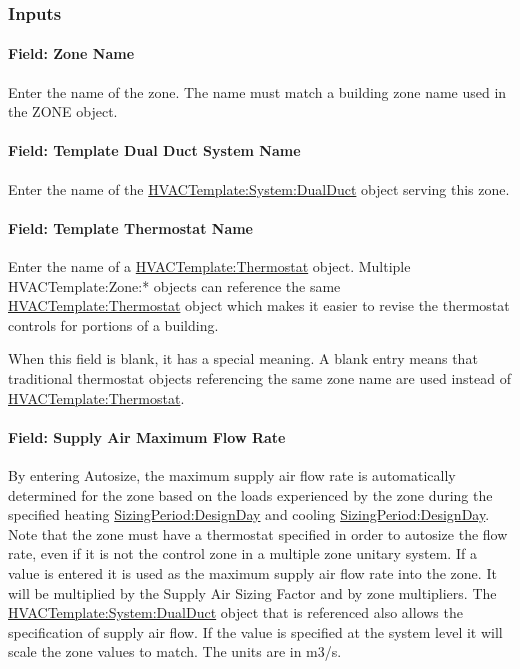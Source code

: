 \subsubsection{Inputs}\label{inputs-13-005}

\paragraph{Field: Zone Name}\label{field-zone-name-12}

Enter the name of the zone. The name must match a building zone name used in the ZONE object.

\paragraph{Field: Template Dual Duct System Name}\label{field-template-dual-duct-system-name}

Enter the name of the \hyperref[hvactemplatesystemdualduct]{HVACTemplate:System:DualDuct} object serving this zone.

\paragraph{Field: Template Thermostat Name}\label{field-template-thermostat-name-12}

Enter the name of a \hyperref[hvactemplatethermostat]{HVACTemplate:Thermostat} object. Multiple HVACTemplate:Zone:* objects can reference the same \hyperref[hvactemplatethermostat]{HVACTemplate:Thermostat} object which makes it easier to revise the thermostat controls for portions of a building.

When this field is blank, it has a special meaning. A blank entry means that traditional thermostat objects referencing the same zone name are used instead of \hyperref[hvactemplatethermostat]{HVACTemplate:Thermostat}.

\paragraph{Field: Supply Air Maximum Flow Rate}\label{field-supply-air-maximum-flow-rate-5}

By entering Autosize, the maximum supply air flow rate is automatically determined for the zone based on the loads experienced by the zone during the specified heating \hyperref[sizingperioddesignday]{SizingPeriod:DesignDay} and cooling \hyperref[sizingperioddesignday]{SizingPeriod:DesignDay}. Note that the zone must have a thermostat specified in order to autosize the flow rate, even if it is not the control zone in a multiple zone unitary system. If a value is entered it is used as the maximum supply air flow rate into the zone. It will be multiplied by the Supply Air Sizing Factor and by zone multipliers. The \hyperref[hvactemplatesystemdualduct]{HVACTemplate:System:DualDuct} object that is referenced also allows the specification of supply air flow. If the value is specified at the system level it will scale the zone values to match. The units are in m3/s.

